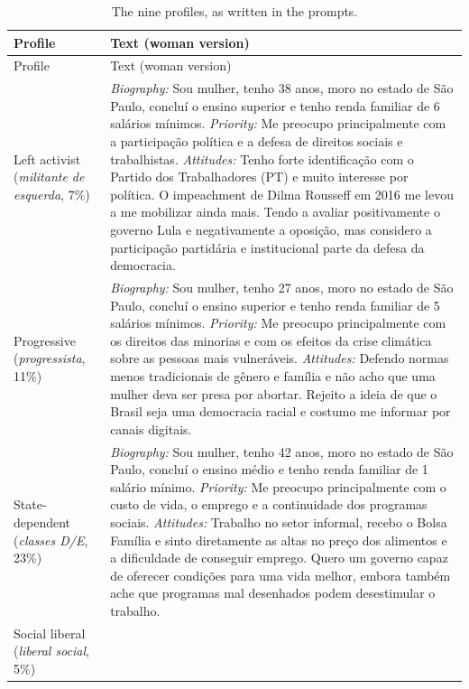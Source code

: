 \documentclass[11pt]{article}
\begin{document}
\begin{longtable}{@{}p{2.6cm}p{12.4cm}@{}}
\caption{The nine profiles, as written in the prompts.\label{tab:profiles}}\\
\toprule
Profile & Text (woman version) \\
\midrule
\endfirsthead
\toprule
Profile & Text (woman version) \\
\midrule
\endhead
\bottomrule
\endfoot
Left activist \newline (\emph{militante de esquerda}, 7\%) &
\emph{Biography:} Sou mulher, tenho 38 anos, moro no estado de São Paulo, concluí o ensino superior e tenho renda familiar de 6 salários mínimos.
\emph{Priority:} Me preocupo principalmente com a participação política e a defesa de direitos sociais e trabalhistas.
\emph{Attitudes:} Tenho forte identificação com o Partido dos Trabalhadores (PT) e muito interesse por política. O impeachment de Dilma Rousseff em 2016 me levou a me mobilizar ainda mais. Tendo a avaliar positivamente o governo Lula e negativamente a oposição, mas considero a participação partidária e institucional parte da defesa da democracia. \\
\addlinespace
Progressive \newline (\emph{progressista}, 11\%) &
\emph{Biography:} Sou mulher, tenho 27 anos, moro no estado de São Paulo, concluí o ensino superior e tenho renda familiar de 5 salários mínimos.
\emph{Priority:} Me preocupo principalmente com os direitos das minorias e com os efeitos da crise climática sobre as pessoas mais vulneráveis.
\emph{Attitudes:} Defendo normas menos tradicionais de gênero e família e não acho que uma mulher deva ser presa por abortar. Rejeito a ideia de que o Brasil seja uma democracia racial e costumo me informar por canais digitais. \\
\addlinespace
State-dependent \newline (\emph{classes D/E}, 23\%) &
\emph{Biography:} Sou mulher, tenho 42 anos, moro no estado de São Paulo, concluí o ensino médio e tenho renda familiar de 1 salário mínimo.
\emph{Priority:} Me preocupo principalmente com o custo de vida, o emprego e a continuidade dos programas sociais.
\emph{Attitudes:} Trabalho no setor informal, recebo o Bolsa Família e sinto diretamente as altas no preço dos alimentos e a dificuldade de conseguir emprego. Quero um governo capaz de oferecer condições para uma vida melhor, embora também ache que programas mal desenhados podem desestimular o trabalho. \\
\addlinespace
Social liberal \newline (\emph{liberal social}, 5\%) &

\end{longtable}
\end{document}
